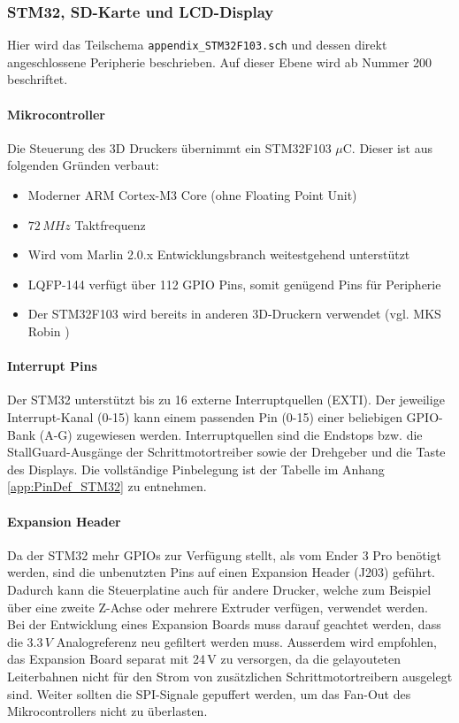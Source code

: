 \subsubsection{STM32, SD-Karte und LCD-Display}
\label{sec:SchemaSTM32}

Hier wird das Teilschema \texttt{appendix\_STM32F103.sch} und dessen direkt angeschlossene Peripherie beschrieben.
Auf dieser Ebene wird ab Nummer 200 beschriftet.\\


\paragraph{Mikrocontroller} 
Die Steuerung des 3D Druckers übernimmt ein STM32F103 $\mu$C. Dieser ist aus folgenden Gründen verbaut:

\begin{itemize}
\item Moderner ARM Cortex-M3 Core (ohne Floating Point Unit)
\item $72\,\si{MHz}$ Taktfrequenz
\item Wird vom Marlin 2.0.x Entwicklungsbranch weitestgehend unterstützt
\item LQFP-144 verfügt über 112 GPIO Pins, somit genügend Pins für Peripherie 
\item Der STM32F103 wird bereits in anderen 3D-Druckern verwendet (vgl. MKS Robin \cite{MKS_Robin})
\end{itemize}

\vspace{3mm}
\paragraph{Interrupt Pins}
Der STM32 unterstützt bis zu 16 externe Interruptquellen (EXTI).
Der jeweilige Interrupt-Kanal (0-15) kann einem passenden Pin (0-15) einer beliebigen GPIO-Bank (A-G) zugewiesen werden.
Interruptquellen sind die Endstops bzw. die StallGuard-Ausgänge der Schrittmotortreiber sowie der Drehgeber und die Taste des Displays.
Die vollständige Pinbelegung ist der Tabelle im Anhang \ref{app:PinDef_STM32} zu entnehmen.\\


\paragraph{Expansion Header}
Da der STM32 mehr GPIOs zur Verfügung stellt, als vom Ender 3 Pro benötigt werden, sind die unbenutzten Pins auf einen Expansion Header (J203) geführt. Dadurch kann die Steuerplatine auch für andere Drucker, welche zum Beispiel über eine zweite Z-Achse oder mehrere Extruder verfügen, verwendet werden.\\
Bei der Entwicklung eines Expansion Boards muss darauf geachtet werden, dass die $3.3\,\si{V}$ Analogreferenz neu gefiltert werden muss.
Ausserdem wird empfohlen, das Expansion Board separat mit 24\,V zu versorgen, da die gelayouteten Leiterbahnen nicht für den Strom von zusätzlichen Schrittmotortreibern ausgelegt sind.
Weiter sollten die SPI-Signale gepuffert werden, um das Fan-Out des Mikrocontrollers nicht zu überlasten.\\


